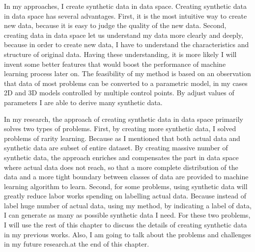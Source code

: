 \documentclass{iitthesis}
\begin{document}
 \label{dataspace: solution}

In my approaches, I create synthetic data in data space. Creating synthetic data in data space has several advantages. First, it is the most intuitive way to create new data, because it is easy to judge the quality of the new data. Second, creating data in data space let us understand my data more clearly and deeply, because in order to create new data, I have to understand the characteristics and structure of original data. Having these understanding, it is more likely I will invent some better features that would boost the performance of machine learning process later on. The feasibility of my method is based on an observation that data of most problems can be converted to a parametric model, in my cases 2D and 3D models controlled by multiple control points. By adjust values of parameters I are able to derive many synthetic data. 

In my research, the approach of creating synthetic data in data space primarily solves two types of problems. First, by creating more synthetic data, I solved problems of rarity learning. Because as I mentioned that both actual data and synthetic data are subset of entire dataset. By creating massive number of synthetic data, the approach enriches and compensates the part in data space where actual data does not reach, so that a more complete distribution of the data and a more tight boundary between classes of data are provided to machine learning algorithm to learn. Second, for some problems, using synthetic data will greatly reduce labor works spending on labelling actual data. Because instead of label huge number of actual data, using my method, by indicating a label of data, I can generate as many as possible synthetic data I need. For these two problems, I will use the rest of this chapter to discuss the details of creating synthetic data in my previous works. Also, I am going to talk about the problems and challenges in my future research.at the end of this chapter.
\end{document}
